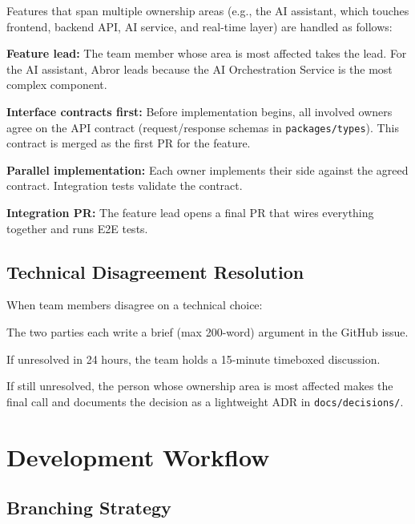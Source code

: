 \documentclass[10pt, a4paper]{article}
\begin{document}
Features that span multiple ownership areas (e.g., the AI assistant, which touches frontend, backend API, AI service, and real-time layer) are handled as follows:

\begin{specenum}
\item \textbf{Feature lead:} The team member whose area is most affected takes the lead. For the AI assistant, Abror leads because the AI Orchestration Service is the most complex component.
\item \textbf{Interface contracts first:} Before implementation begins, all involved owners agree on the API contract (request/response schemas in \texttt{packages/types}). This contract is merged as the first PR for the feature.
\item \textbf{Parallel implementation:} Each owner implements their side against the agreed contract. Integration tests validate the contract.
\item \textbf{Integration PR:} The feature lead opens a final PR that wires everything together and runs E2E tests.
\end{specenum}

\subsection{Technical Disagreement Resolution}

When team members disagree on a technical choice:
\begin{specenum}
\item The two parties each write a brief (max 200-word) argument in the GitHub issue.
\item If unresolved in 24 hours, the team holds a 15-minute timeboxed discussion.
\item If still unresolved, the person whose ownership area is most affected makes the final call and documents the decision as a lightweight ADR in \texttt{docs/decisions/}.
\end{specenum}


\section{Development Workflow}

\subsection{Branching Strategy}
\end{document}

